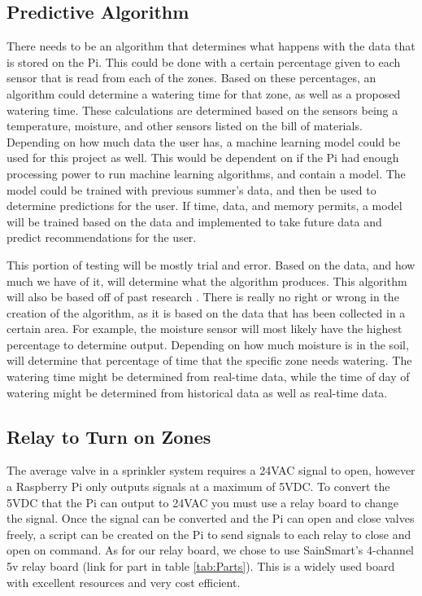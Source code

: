 \documentclass[letterpaper, 10 pt, conference]{ieeeconf}  %
\begin{document}
\subsection{Predictive Algorithm}
There needs to be an algorithm that determines what happens with the data that is stored on the Pi. This could be done with a certain percentage given to each sensor that is read from each of the zones. Based on these percentages, an algorithm could determine a watering time for that zone, as well as a proposed watering time. These calculations are determined based on the sensors being a temperature, moisture, and other sensors listed on the bill of materials. Depending on how much data the user has, a machine learning model could be used for this project as well. This would be dependent on if the Pi had enough processing power to run machine learning algorithms, and contain a model. The model could be trained with previous summer's data, and then be used to determine predictions for the user. If time, data, and memory permits, a model will be trained based on the data and implemented to take future data and predict recommendations for the user. 

This portion of testing will be mostly trial and error. Based on the data, and how much we have of it, will determine what the algorithm produces. This algorithm will also be based off of past research \cite{SmartSprinkler}. There is really no right or wrong in the creation of the algorithm, as it is based on the data that has been collected in a certain area. For example, the moisture sensor will most likely have the highest percentage to determine output. Depending on how much moisture is in the soil, will determine that percentage of time that the specific zone needs watering. The watering time might be determined from real-time data, while the time of day of watering might be determined from historical data as well as real-time data. 

\subsection{Relay to Turn on Zones}
 The average valve in a sprinkler system requires a 24VAC signal to open, however a Raspberry Pi only outputs signals at a maximum of 5VDC. To convert the 5VDC that the Pi can output to 24VAC you must use a relay board to change the signal. Once the signal can be converted and the Pi can open and close valves freely, a script can be created on the Pi to send signals to each relay to close and open on command.
As for our relay board, we chose to use SainSmart's \cite{relayBoard} 4-channel 5v relay board (link for part in table \ref{tab:Parts}). This is a widely used board with excellent resources and very cost efficient.
\end{document}
